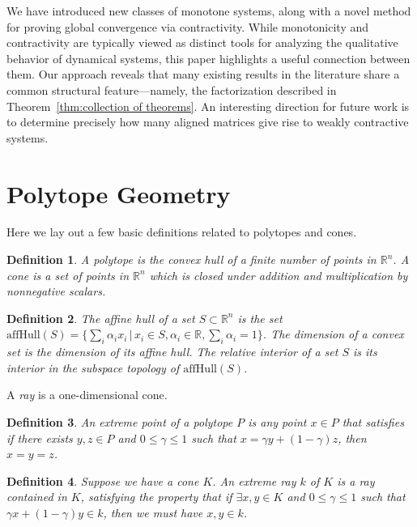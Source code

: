 \documentclass{article}
\newtheorem{define}{Definition}
\newcommand{\st}{\,|\,}
\begin{document}
We have introduced new classes of monotone systems, along with a novel method for proving global convergence via contractivity. While monotonicity and contractivity are typically viewed as distinct tools for analyzing the qualitative behavior of dynamical systems, this paper highlights a useful connection between them. Our approach reveals that many existing results in the literature share a common structural feature—namely, the factorization described in Theorem~\ref{thm:collection of theorems}. An interesting direction for future work is to determine precisely how many aligned matrices give rise to weakly contractive systems.



\appendix




\section{Polytope Geometry}
\label{section_appendix_polytope_terms}
Here we lay out a few basic definitions related to polytopes and cones.

\begin{define}
    A \textit{polytope} is the convex hull of a finite number of points in $\mathbb{R}^n$. A \textit{cone} is a set of points in $\mathbb{R}^n$ which is closed under addition and multiplication by nonnegative scalars. 
\end{define}

\begin{define}
    The \textit{affine hull} of a set $S \subset \mathbb{R}^n$ is the set $\mbox{affHull}(S) = \{ \sum_i \alpha_i x_i \st  x_i \in S, \alpha_i \in \mathbb{R}, \sum_i \alpha_i = 1 \}$. The \textit{dimension} of a convex set is the dimension of its affine hull. The \textit{relative interior} of a set $S$ is its interior in the subspace topology of $\mbox{affHull}(S)$.
\end{define}

A \textit{ray} is a one-dimensional cone.

\begin{define}
    An \textit{extreme point} of a polytope $P$ is any point $x \in P$ that satisfies if there exists $y,z \in P$ and $0 \leq \gamma \leq 1$ such that $x = \gamma y + (1-\gamma)z $, then $x=y=z$.
\end{define}

\begin{define}
    Suppose we have a cone $K$. An \textit{extreme ray} $k$ of $K$ is a ray contained in  $K$, satisfying the property that if $\exists x,y \in K$ and $0 \leq \gamma \leq 1$ such that $\gamma x + (1-\gamma) y \in k$, then we must have $x,y \in k$.
\end{define}
\end{document}
